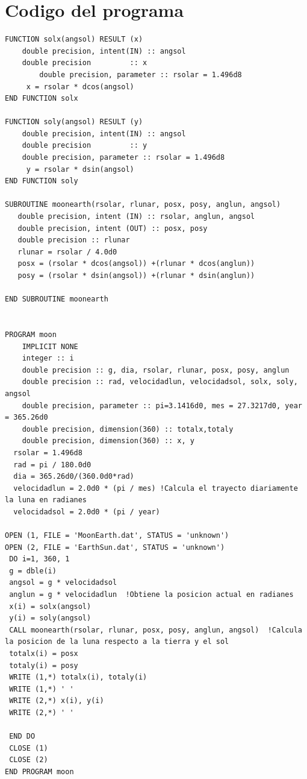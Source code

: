 \documentclass[12pt,a4paper,twoside]{article}
\begin{document}
\clearpage
\section{Codigo del programa}
\begin{verbatim}
FUNCTION solx(angsol) RESULT (x)
	double precision, intent(IN) :: angsol
	double precision 	     :: x
        double precision, parameter :: rsolar = 1.496d8
	 x = rsolar * dcos(angsol)
END FUNCTION solx

FUNCTION soly(angsol) RESULT (y)
	double precision, intent(IN) :: angsol
	double precision 	     :: y
	double precision, parameter :: rsolar = 1.496d8
	 y = rsolar * dsin(angsol)
END FUNCTION soly

SUBROUTINE moonearth(rsolar, rlunar, posx, posy, anglun, angsol)
   double precision, intent (IN) :: rsolar, anglun, angsol
   double precision, intent (OUT) :: posx, posy
   double precision :: rlunar
   rlunar = rsolar / 4.0d0
   posx = (rsolar * dcos(angsol)) +(rlunar * dcos(anglun))
   posy = (rsolar * dsin(angsol)) +(rlunar * dsin(anglun))
 
END SUBROUTINE moonearth 


PROGRAM moon
	IMPLICIT NONE
	integer :: i
	double precision :: g, dia, rsolar, rlunar, posx, posy, anglun
	double precision :: rad, velocidadlun, velocidadsol, solx, soly, angsol
	double precision, parameter :: pi=3.1416d0, mes = 27.3217d0, year = 365.26d0
	double precision, dimension(360) :: totalx,totaly
	double precision, dimension(360) :: x, y
  rsolar = 1.496d8
  rad = pi / 180.0d0
  dia = 365.26d0/(360.0d0*rad) 
  velocidadlun = 2.0d0 * (pi / mes) !Calcula el trayecto diariamente la luna en radianes
  velocidadsol = 2.0d0 * (pi / year)  
  
OPEN (1, FILE = 'MoonEarth.dat', STATUS = 'unknown')
OPEN (2, FILE = 'EarthSun.dat', STATUS = 'unknown')
 DO i=1, 360, 1
 g = dble(i)
 angsol = g * velocidadsol
 anglun = g * velocidadlun  !Obtiene la posicion actual en radianes
 x(i) = solx(angsol)
 y(i) = soly(angsol) 
 CALL moonearth(rsolar, rlunar, posx, posy, anglun, angsol)  !Calcula la posicion de la luna respecto a la tierra y el sol
 totalx(i) = posx
 totaly(i) = posy
 WRITE (1,*) totalx(i), totaly(i)
 WRITE (1,*) ' '
 WRITE (2,*) x(i), y(i)
 WRITE (2,*) ' '
 
 END DO
 CLOSE (1)
 CLOSE (2)
END PROGRAM moon
\end{verbatim}
\end{document}
